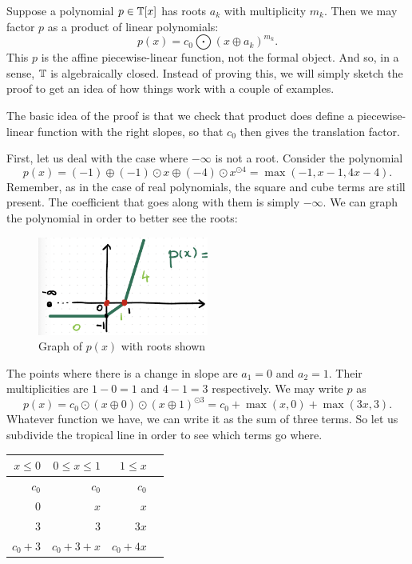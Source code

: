 \documentclass[12pt]{memoir}
\theoremstyle{definition}
\begin{document}
Suppose a polynomial $p\in\mathbb{T}[x]$ has roots $a_k$ with multiplicity $m_k$. Then we may factor $p$ as a product of linear polynomials: 
$$p(x)=c_0\bigodot(x\oplus a_k)^{m_k}.$$
This $p$ is the affine piecewise-linear function, not the formal object. And so, in a sense, $\mathbb{T}$ is algebraically closed. Instead of proving this, we will simply sketch the proof to get an idea of how things work with a couple of examples.\par 
The basic idea of the proof is that we check that product does define a piecewise-linear function with the right slopes, so that $c_0$ then gives the translation factor.
\begin{Ex}
First, let us deal with the case where $-\infty$ is not a root. Consider the polynomial 
$$p(x)=(-1)\oplus(-1)\odot x\oplus(-4)\odot x^{\odot4}=\max(-1,x-1,4x-4).$$
Remember, as in the case of real polynomials, the square and cube terms are still present. The coefficient that goes along with them is simply $-\infty$. We can graph the polynomial in order to better see the roots:
\begin{figure}[h!]
    \centering
    \includegraphics[width=0.5\textwidth]{figs/fig4-1-InfinityNotRoot.png}
    \caption{Graph of $p(x)$ with roots shown}
    \label{fig:4.1-InfinityNotRoot}
\end{figure}

The points where there is a change in slope are $a_1=0$ and $a_2=1$. Their multiplicities are $1-0=1$ and $4-1=3$ respectively. We may write $p$ as 
$$p(x)=c_0\odot(x\oplus 0)\odot(x\oplus 1)^{\odot3}=c_0+\max(x,0)+\max(3x,3).$$
Whatever function we have, we can write it as the sum of three terms. So let us subdivide the tropical line in order to see which terms go where.
\begin{table}[h!]
    \centering
    \begin{tabular}{rrrr}\toprule
        $x\leq 0$ & $0\leq x\leq 1$ & $1\leq x$\\ \midrule
        $c_0$& $c_0$&$c_0$\\
        $0$&$x$ & $x$\\
        $3$& $3$ & $3x$\\ \midrule
        $c_0+3$&$c_0+3+x$&$c_0+4x$\\
   \bottomrule
    \end{tabular}
    \end{table}


\end{Ex}
\end{document}
